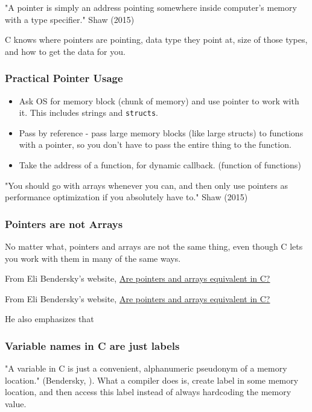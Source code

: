 \documentclass[10pt]{amsart}
\begin{document}
\begin{multicols*}{2}
"A pointer is simply an address pointing somewhere inside computer's memory with a type specifier."  Shaw (2015) \cite{Shaw2015}


C knows where pointers are pointing, data type they point at, size of those types, and how to get the data for you.  

\subsubsection{Practical Pointer Usage}
\begin{itemize}
	\item Ask OS for memory block (chunk of memory) and use pointer to work with it.  This includes strings and \verb|structs|.  
	\item Pass by reference - pass large memory blocks (like large structs) to functions with a pointer, so you don't have to pass the entire thing to the function.  
	\item Take the address of a function, for dynamic callback. (function of functions)
\end{itemize}

"You should go with arrays whenever you can, and then only use pointers as performance optimization if you absolutely have to."  Shaw (2015) \cite{Shaw2015}

\subsubsection{Pointers are not Arrays}  

No matter what, pointers and arrays are not the same thing, even though C lets you work with them in many of the same ways.  

From Eli Bendersky's website, \href{https://eli.thegreenplace.net/2009/10/21/are-pointers-and-arrays-equivalent-in-c}{Are pointers and arrays equivalent in C?}

From Eli Bendersky's website, \href{https://eli.thegreenplace.net/2009/10/21/are-pointers-and-arrays-equivalent-in-c}{Are pointers and arrays equivalent in C?}

He also emphasizes that 

\subsubsection{Variable names in C are just labels}  

"A variable in C is just a convenient, alphanumeric pseudonym of a memory location." (Bendersky, \cite{Bend}).  What a compiler does is, create label in some memory location, and then access this label instead of always hardcoding the memory value.   


\end{multicols*}
\end{document}
